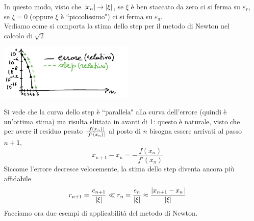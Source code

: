 \documentclass[12pt]{article}
\DeclarePairedDelimiter{\abs}{\lvert}{\rvert}
\begin{document}
In questo modo, visto che $\abs{x_n} \to \abs{\xi}$, se $\xi$ è  ben staccato da zero ci si ferma su $\varepsilon_r$, se $\xi = 0$ (oppure $\xi$ è ``piccolissimo") ci si ferma su $\varepsilon_a$.\\
Vediamo come si comporta la stima dello step per il metodo di Newton nel calcolo di $\sqrt{2}$
\begin{center}
\includegraphics[width=0.5\textwidth]{pag27.JPG}
\end{center}
Si vede che la curva dello step è ``parallela" alla curva dell'errore (quindi è un'ottima stima) ma risulta slittata in avanti di 1: questo è naturale, visto che per avere il residuo pesato $\frac{\abs{f(x_n)}}{\abs{f'(x_n)}}$ al posto di $n$ bisogna essere arrivati al passo $n+1$, 
\[x_{n+1} - x_n = - \frac{f(x_n)}{f'(x_n)}\]
Siccome l'errore decresce velocemente, la stima dello step diventa ancora più affidabile
\[ r_{n+1} = \frac{e_{n+1}}{\abs{\xi}} \ll r_n = \frac{e_n}{\abs{\xi}} \approx \frac{\abs{x_{n+1} - x_n}}{\abs{\xi}}\]
Facciamo ora due esempi di applicabilità del metodo di Newton.
\end{document}
